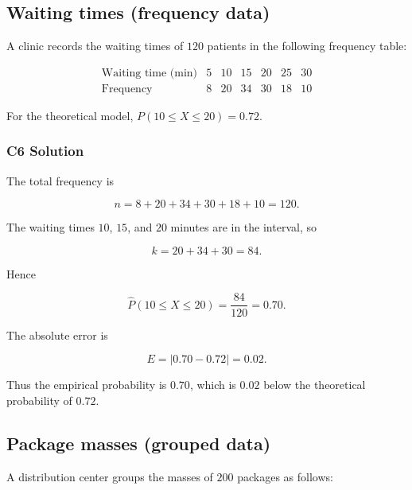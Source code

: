 \subsection{Waiting times (frequency data)}
\label{sec:c6-only-frequency}

A clinic records the waiting times of $120$ patients in the following
frequency table:

\[
\begin{array}{c|cccccc}
	\text{Waiting time (min)} & 5 & 10 & 15 & 20 & 25 & 30 \\ \hline
	\text{Frequency} & 8 & 20 & 34 & 30 & 18 & 10
\end{array}
\]

For the theoretical model,
$P(10\leq X\leq20)=0.72$.


\subsubsection*{C6 Solution}
\label{subsec:c6-only-frequency-solution}

The total frequency is

\[
n=8+20+34+30+18+10=120.
\]

The waiting times $10$, $15$, and $20$ minutes are in the interval, so

\[
k=20+34+30=84.
\]

Hence

\[
\widehat P(10\leq X\leq20)=\frac{84}{120}=0.70.
\]

The absolute error is

\[
E=|0.70-0.72|=0.02.
\]

Thus the empirical probability is $0.70$, which is $0.02$ below the
theoretical probability of $0.72$.


\subsection{Package masses (grouped data)}
\label{sec:c6-only-grouped}

A distribution center groups the masses of $200$ packages as follows:

